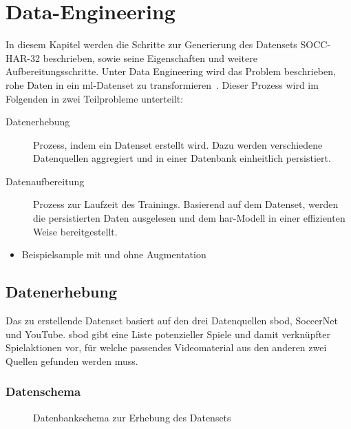 \chapter{Data-Engineering}
\label{ch:data}

\newcommand{\noaction}{37521\ }
\newcommand{\novideos}{194\ }
\newcommand{\nomatches}{152\ }

In diesem Kapitel werden die Schritte zur Generierung des Datensets SOCC-HAR-32 beschrieben, sowie seine Eigenschaften und weitere Aufbereitungsschritte.
Unter Data Engineering wird das Problem beschrieben, rohe Daten in ein \gls{ml}-Datenset zu transformieren~\cite{Burkov19}.
Dieser Prozess wird im Folgenden in zwei Teilprobleme unterteilt:
\begin{description}
    \item[Datenerhebung] Prozess, indem ein Datenset erstellt wird.
        Dazu werden verschiedene Datenquellen aggregiert und in einer Datenbank einheitlich persistiert.
    \item[Datenaufbereitung] Prozess zur Laufzeit des Trainings.
        Basierend auf dem Datenset, werden die persistierten Daten ausgelesen und dem \gls{har}-Modell in einer effizienten Weise bereitgestellt.
\end{description}

\begin{tcolorbox}[title=WIP]
    \begin{itemize}
        \item Beispielsample mit und ohne Augmentation
    \end{itemize}
\end{tcolorbox}


\section{Datenerhebung}
\label{sec:datenerhebung}

Das zu erstellende Datenset basiert auf den drei Datenquellen \gls{sbod}, SoccerNet und YouTube.
\gls{sbod} gibt eine Liste potenzieller Spiele und damit verknüpfter Spielaktionen vor, für welche passendes Videomaterial aus den anderen zwei Quellen gefunden werden muss.

\subsection{Datenschema}
\label{subsec:schema}

\begin{figure}
    \centering
    \caption{Datenbankschema zur Erhebung des Datensets}
    \label{fig:classes}
\end{figure}

